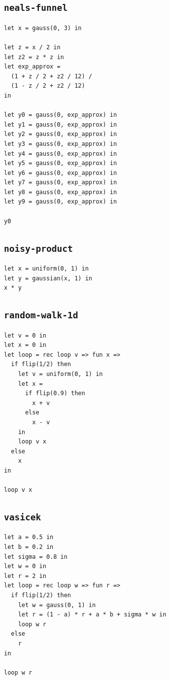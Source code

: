 \subsection{\texttt{neals-funnel}}

\begin{lstlisting}[breaklines=true]
let x = gauss(0, 3) in

let z = x / 2 in
let z2 = z * z in
let exp_approx =
  (1 + z / 2 + z2 / 12) /
  (1 - z / 2 + z2 / 12)
in

let y0 = gauss(0, exp_approx) in
let y1 = gauss(0, exp_approx) in
let y2 = gauss(0, exp_approx) in
let y3 = gauss(0, exp_approx) in
let y4 = gauss(0, exp_approx) in
let y5 = gauss(0, exp_approx) in
let y6 = gauss(0, exp_approx) in
let y7 = gauss(0, exp_approx) in
let y8 = gauss(0, exp_approx) in
let y9 = gauss(0, exp_approx) in

y0
\end{lstlisting}

\subsection{\texttt{noisy-product}}

\begin{lstlisting}[breaklines=true]
let x = uniform(0, 1) in
let y = gaussian(x, 1) in
x * y
\end{lstlisting}

\subsection{\texttt{random-walk-1d}}

\begin{lstlisting}[breaklines=true]
let v = 0 in
let x = 0 in
let loop = rec loop v => fun x =>
  if flip(1/2) then
    let v = uniform(0, 1) in
    let x =
      if flip(0.9) then
        x + v
      else
        x - v
    in
    loop v x
  else
    x
in

loop v x
\end{lstlisting}

\subsection{\texttt{vasicek}}

\begin{lstlisting}[breaklines=true]
let a = 0.5 in
let b = 0.2 in
let sigma = 0.8 in
let w = 0 in
let r = 2 in
let loop = rec loop w => fun r =>
  if flip(1/2) then
    let w = gauss(0, 1) in
    let r = (1 - a) * r + a * b + sigma * w in
    loop w r
  else
    r
in

loop w r
\end{lstlisting}


